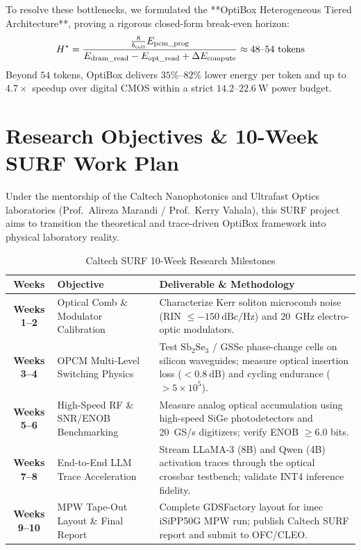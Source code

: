 \documentclass[11pt,a4paper]{article}
\begin{document}
To resolve these bottlenecks, we formulated the **OptiBox Heterogeneous Tiered Architecture**, proving a rigorous closed-form break-even horizon:
\begin{equation}
H^* = \frac{\frac{8}{b_{\rm cell}} E_{\rm pcm\_prog}}{E_{\rm dram\_read} - E_{\rm opt\_read} + \Delta E_{\rm compute}} \approx 48\text{--}54\ \text{tokens}
\end{equation}
Beyond $54$ tokens, OptiBox delivers $35\%\text{--}82\%$ lower energy per token and up to $4.7\times$ speedup over digital CMOS within a strict $14.2\text{--}22.6\ \text{W}$ power budget.

\section{Research Objectives \& 10-Week SURF Work Plan}
Under the mentorship of the Caltech Nanophotonics and Ultrafast Optics laboratories (Prof.~Alireza Marandi / Prof.~Kerry Vahala), this SURF project aims to transition the theoretical and trace-driven OptiBox framework into physical laboratory reality.

\begin{table}[htbp]
\centering
\small
\caption{Caltech SURF 10-Week Research Milestones}
\label{tab:surf_plan}
\begin{tabular}{cp{6.8cm}p{6.8cm}}
\toprule
\textbf{Weeks} & \textbf{Objective} & \textbf{Deliverable \& Methodology} \\
\midrule
\textbf{Weeks 1--2} & Optical Comb \& Modulator Calibration & Characterize Kerr soliton microcomb noise (RIN $\le -150\ \text{dBc/Hz}$) and 20~GHz electro-optic modulators. \\
\textbf{Weeks 3--4} & OPCM Multi-Level Switching Physics & Test $\text{Sb}_2\text{Se}_3$ / GSSe phase-change cells on silicon waveguides; measure optical insertion loss ($<0.8\ \text{dB}$) and cycling endurance ($>5\times 10^5$). \\
\textbf{Weeks 5--6} & High-Speed RF \& SNR/ENOB Benchmarking & Measure analog optical accumulation using high-speed SiGe photodetectors and 20~GS/s digitizers; verify ENOB $\ge 6.0$ bits. \\
\textbf{Weeks 7--8} & End-to-End LLM Trace Acceleration & Stream LLaMA-3 (8B) and Qwen (4B) activation traces through the optical crossbar testbench; validate INT4 inference fidelity. \\
\textbf{Weeks 9--10} & MPW Tape-Out Layout \& Final Report & Complete GDSFactory layout for imec iSiPP50G MPW run; publish Caltech SURF report and submit to OFC/CLEO. \\
\bottomrule
\end{tabular}
\end{table}
\end{document}
